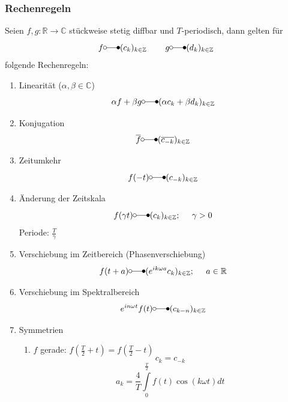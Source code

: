\documentclass[a4paper,twocolumn,10pt]{article}
\begin{document}
\subsubsection{Rechenregeln}
Seien $f,g:\mathbb{R}\rightarrow\mathbb{C}$ stückweise stetig diffbar und $T$-periodisch, dann gelten für
\begin{equation*}
f\laplace (c_k)_{k\in\mathbb{Z}}\;\;\;\;\;\;\;\;g\laplace (d_k)_{k\in\mathbb{Z}}
\end{equation*}
folgende Rechenregeln:
\begin{enumerate}[label=$\bullet$]
\item Linearität ($\alpha,\beta\in\mathbb{C}$)
\begin{equation*}
\alpha f+\beta g\laplace (\alpha c_k+\beta d_k)_{k\in\mathbb{Z}}
\end{equation*}
\item Konjugation
\begin{equation*}
\overline{f}\laplace (\overline{c_{-k}})_{k\in\mathbb{Z}}
\end{equation*}
\item Zeitumkehr
\begin{equation*}
f(-t)\laplace (c_{-k})_{k\in\mathbb{Z}}
\end{equation*}
\item Änderung der Zeitskala
\begin{equation*}
f(\gamma t)\laplace (c_k)_{k\in\mathbb{Z}};\;\;\;\;\;\gamma>0
\end{equation*}
Periode: $\frac{T}{\gamma}$
\item Verschiebung im Zeitbereich (Phasenverschiebung)
\begin{equation*}
f(t+a)\laplace (e^{ik\omega a}c_k)_{k\in\mathbb{Z}};\;\;\;\;\;a\in\mathbb{R}
\end{equation*}
\item Verschiebung im Spektralbereich
\begin{equation*}
e^{in\omega t}f(t)\laplace (c_{k-n})_{k\in\mathbb{Z}}
\end{equation*}
\item Symmetrien
\begin{enumerate}[label=-]
\item $f$ gerade: $f\left(\frac{T}{2}+t\right)=f\left(\frac{T}{2}-t\right)$
\begin{equation*}
c_k=c_{-k}
\end{equation*}
\begin{equation*}
a_k=\frac{4}{T}\int\limits_{0}^{\frac{T}{2}}f(t)\cos(k\omega t)dt
\end{equation*}

\end{enumerate}
\end{enumerate}
\end{document}
